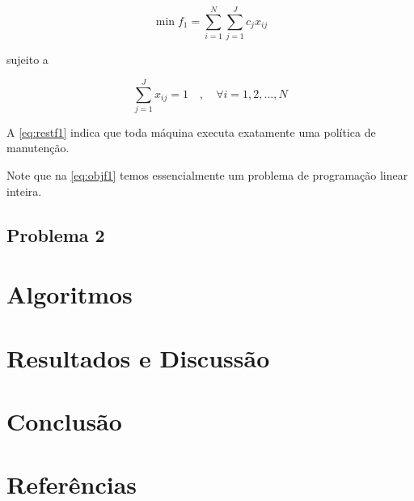 \documentclass[
	12pt,				%
	oneside,			%
	a4paper,			%
	chapter=TITLE,
	sumario=tradicional,
	english,			%
	brazil				%
]{abntex2}
\begin{document}
\begin{equation}\label{eq:objf1}
	\min f_1 = \sum_{i=1}^{N} \sum_{j=1}^{J} c_j x_{ij}
\end{equation}

\noindent sujeito a 

\begin{equation}\label{eq:restf1}
	\sum_{j=1}^{J} x_{ij} = 1 \quad , \quad \forall i = {1, 2, ..., N}
\end{equation}

A \autoref{eq:restf1} indica que toda máquina executa exatamente uma política de manutenção.

Note que na \autoref{eq:objf1} temos essencialmente um problema de programação linear inteira.

\section{Problema 2}

\chapter{Algoritmos}\label{cap:algoritmos} 

\lipsum[1-2]


\chapter{Resultados e Discussão}\label{cap:resultados} 

\lipsum[1-2]


\chapter{Conclusão}\label{cap:conclusao} 

\lipsum[1-2]


\chapter{Referências}\label{cap:referencias} 

\lipsum[1-2]
\end{document}

